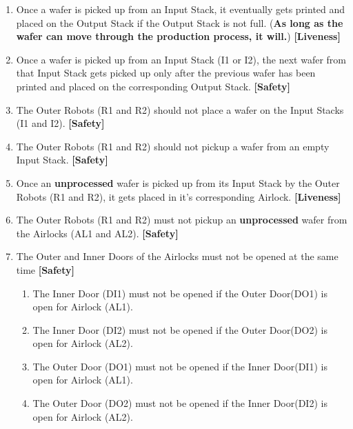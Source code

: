 \documentclass[a4paper,12pt]{article}
\begin{document}
\begin{enumerate}
\item Once a wafer is picked up from an Input Stack, it eventually gets printed and placed on the Output Stack if the Output Stack is not full. (\textbf{As long as the wafer can move through the production process, it will.}) \textbf{[Liveness]}
\item Once a wafer is picked up from an Input Stack (I1 or I2), the next wafer from that Input Stack gets picked up only after the previous wafer has been printed and placed on the corresponding Output Stack. \textbf{[Safety]}
\item The Outer Robots (R1 and R2) should not place a wafer on the Input Stacks (I1 and I2). \textbf{[Safety]}
\item The Outer Robots (R1 and R2) should not pickup a wafer from an empty Input Stack. \textbf{[Safety]}
\item Once an \textbf{unprocessed} wafer is picked up from its Input Stack by the Outer Robots (R1 and R2), it gets placed in it's corresponding Airlock. \textbf{[Liveness]}
\item The Outer Robots (R1 and R2) must not pickup an \textbf{unprocessed} wafer from the Airlocks (AL1 and AL2). \textbf{[Safety]}
\item The Outer and Inner Doors of the Airlocks must not be opened at the same time \textbf{[Safety]}
\begin{enumerate}
    \item The Inner Door (DI1) must not be opened if the Outer Door(DO1) is open for Airlock (AL1).

    \item The Inner Door (DI2) must not be opened if the Outer Door(DO2) is open for Airlock (AL2).

    \item The Outer Door (DO1) must not be opened if the Inner Door(DI1) is open for Airlock (AL1).

    \item The Outer Door (DO2) must not be opened if the Inner Door(DI2) is open for Airlock (AL2).


\end{enumerate}
\end{enumerate}
\end{document}
